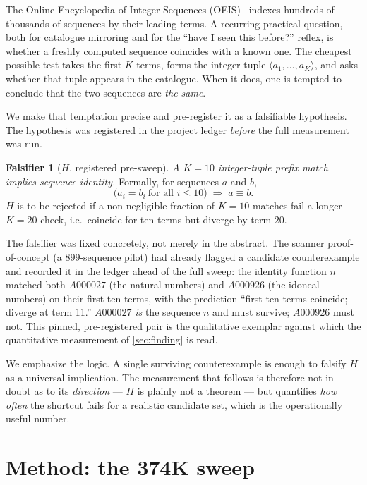 \documentclass[11pt,a4paper]{article}
\newcommand{\Kten}{K\!=\!10}
\newcommand{\Ktwenty}{K\!=\!20}
\theoremstyle{definition}
\newtheorem{falsifier}{Falsifier}
\begin{document}
The Online Encyclopedia of Integer Sequences (OEIS)~\citep{oeis} indexes
hundreds of thousands of sequences by their leading terms. A recurring
practical question, both for catalogue mirroring and for the ``have I seen this
before?'' reflex, is whether a freshly computed sequence coincides with a known
one. The cheapest possible test takes the first $K$ terms, forms the integer
tuple $\langle a_1,\dots,a_K\rangle$, and asks whether that tuple appears in the
catalogue. When it does, one is tempted to conclude that the two sequences are
\emph{the same}.

We make that temptation precise and pre-register it as a falsifiable
hypothesis. The hypothesis was registered in the project ledger \emph{before}
the full measurement was run.

\begin{falsifier}[$H$, registered pre-sweep]
\label{fals:H}
\emph{A $\Kten$ integer-tuple prefix match implies sequence identity.} Formally,
for sequences $a$ and $b$,
\[
  \big(a_i = b_i \ \text{for all } i \le 10\big)
  \;\Longrightarrow\;
  a \equiv b .
\]
$H$ is to be rejected if a non-negligible fraction of $\Kten$ matches fail a
longer $\Ktwenty$ check, i.e.\ coincide for ten terms but diverge by term $20$.
\end{falsifier}

The falsifier was fixed concretely, not merely in the abstract. The
scanner proof-of-concept (a $899$-sequence pilot) had already flagged a
candidate counterexample and recorded it in the ledger ahead of the full sweep:
the identity function $n$ matched both $A000027$ (the natural numbers) and
$A000926$ (the idoneal numbers) on their first ten terms, with the prediction
``first ten terms coincide; diverge at term 11.'' $A000027$ \emph{is} the
sequence $n$ and must survive; $A000926$ must not. This pinned, pre-registered
pair is the qualitative exemplar against which the quantitative measurement of
\textsection\ref{sec:finding} is read.

We emphasize the logic. A single surviving counterexample is enough to falsify
$H$ as a universal implication. The measurement that follows is therefore not
in doubt as to its \emph{direction} --- $H$ is plainly not a theorem --- but
quantifies \emph{how often} the shortcut fails for a realistic candidate set,
which is the operationally useful number.

\section{Method: the 374K sweep}
\label{sec:method}
\end{document}

